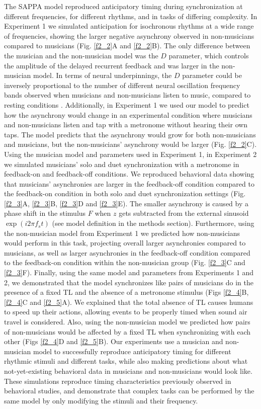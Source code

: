 \documentclass{report}
\begin{document}
The SAPPA model reproduced anticipatory timing during synchronization at different frequencies, for different rhythms, and in tasks of differing complexity. In Experiment 1 we simulated anticipation for isochronous rhythms at a wide range of frequencies, showing the larger negative asynchrony observed in non-musicians compared to musicians (Fig.{} \ref{f2_2}A and \ref{f2_2}B). The only difference between the musician and the non-musician model was the $D$ parameter, which controls the amplitude of the delayed recurrent feedback and was larger in the non-musician model. In terms of neural underpinnings, the $D$ parameter could be inversely proportional to the number of different neural oscillation frequency bands observed when musicians and non-musicians listen to music, compared to resting conditions \cite{bhattacharya2005phase}. Additionally, in Experiment 1 we used our model to predict how the asynchrony would change in an experimental condition where musicians and non-musicians listen and tap with a metronome without hearing their own taps. The model predicts that the asynchrony would grow for both non-musicians and musicians, but the non-musicians' asynchrony would be larger (Fig.{} \ref{f2_2}C). Using the musician model and parameters used in Experiment 1, in Experiment 2 we simulated musicians' solo and duet synchronization with a metronome in feedback-on and feedback-off conditions. We reproduced behavioral data showing that musicians' asynchronies are larger in the feedback-off condition compared to the feedback-on condition in both solo and duet synchronization settings (Fig.{} \ref{f2_3}A, \ref{f2_3}B, \ref{f2_3}D and \ref{f2_3}E). The smaller asynchrony is caused by a phase shift in the stimulus $F$ when $z$ gets subtracted from the external sinusoid $\exp(i2\pi f_s t)$ (see model definition in the methods section). Furthermore, using the non-musician model from Experiment 1 we predicted how non-musicians would perform in this task, projecting overall larger asynchronies compared to musicians, as well as larger asynchronies in the feedback-off condition compared to the feedback-on condition within the non-musician group (Fig.{} \ref{f2_3}C and \ref{f2_3}F). Finally, using the same model and parameters from Experiments 1 and 2, we demonstrated that the model synchronizes like pairs of musicians do in the presence of a fixed TL and the absence of a metronome stimulus (Figs \ref{f2_4}B, \ref{f2_4}C and \ref{f2_5}A). We explained that the total absence of TL causes humans to speed up their actions, allowing events to be properly timed when sound air travel is considered. Also, using the non-musician model we predicted how pairs of non-musicians would be affected by a fixed TL when synchronizing with each other (Figs \ref{f2_4}D and \ref{f2_5}B). Our experiments use a musician and non-musician model to successfully reproduce anticipatory timing for different rhythmic stimuli and different tasks, while also making predictions about what not-yet-existing behavioral data in musicians and non-musicians would look like. These simulations reproduce timing characteristics previously observed in behavioral studies, and demonstrate that complex tasks can be performed by the same model by only modifying the stimuli and their frequency.
\end{document}
